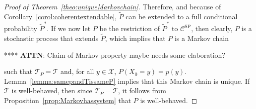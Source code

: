 \documentclass[10pt]{paper}
\theoremstyle{definition}
\newcommand{\states}{\mathcal{X}}
\begin{document}
\begin{proof}[Proof of Theorem~\ref{theo:uniqueMarkovchain}]
Therefore, and because of Corollary~\ref{corol:coherentextendable}, $\tilde{P}$ can be extended to a full conditional probability $\tilde{P}^*$. If we now let $P$ be the restriction of $\tilde{P}^*$ to $\mathcal{C}^\mathrm{SP}$, then clearly, $P$ is a stochastic process that extends $\tilde{P}$, which implies that $P$ is a Markov chain 

**** {\bf ATTN}: Claim of Markov property maybe needs some elaboration?

such that $\mathcal{T}_P=\mathcal{T}$ and, for all $y\in\states$, $P(X_0=y)=p(y)$. Lemma~\ref{lemma:samepandTissameP} implies that this Markov chain is unique. If $\mathcal{T}$ is well-behaved, then since $\mathcal{T}_P=\mathcal{T}$, it follows from Proposition~\ref{prop:Markovhassystem} that $P$ is well-behaved.
\end{proof}
\end{document}
